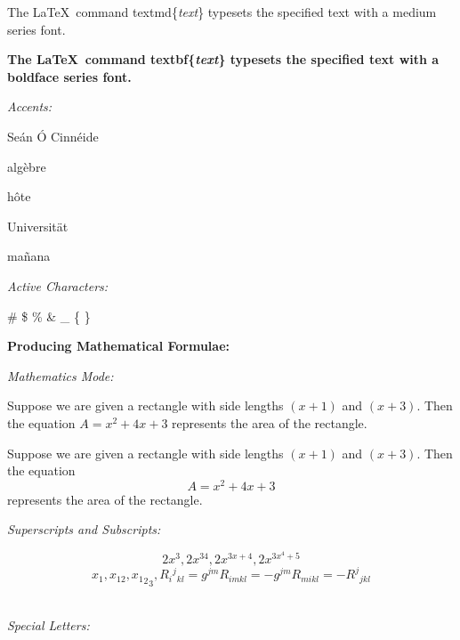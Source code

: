 \documentclass[12pt]{article}
\begin{document}
\textmd{The \LaTeX\ command \texttt{\textup{}}textmd\{\textit{text}\} typesets the specified text with a medium series font.}

\textbf{The \LaTeX\ command \texttt{\textup{}}\textmd{textbf\{\textit{text}\}} typesets the specified text with a boldface series font.} \\

\noindent
\begin{large}\textit{Accents:}\end{large}

Se\'{a}n \'{O} Cinn\'{e}ide

alg\`{e}bre

h\^{o}te

Universit\"{a}t

ma\~{n}ana \\

\noindent
\begin{large}\textit{Active Characters:}\end{large}

\# \$ \% \& \_ \{ \} \texttt{}   \\

\bigbreak
\noindent
\begin{Large}\textbf{Producing Mathematical Formulae:}\end{Large}
\bigbreak

\noindent
\begin{large}\textit{Mathematics Mode:}\end{large}

Suppose we are given a rectangle with side lengths $(x+1)$ and $(x+3)$. Then the equation $A=x^2+4x+3$ represents the area of the rectangle.

Suppose we are given a rectangle with side lengths $(x+1)$ and $(x+3)$. Then the equation $$A=x^2+4x+3$$ represents the area of the rectangle. \\

\noindent
\begin{large}\textit{Superscripts and Subscripts:}\end{large}

\[ 2x^3, 2x^{34}, 2x^{3x+4}, 2x^{3x^4+5} \]
\[ x_1, x_{12}, {{x_1}_2}_3, 
   R_i{}^j{}_{kl} = g^{jm} R_{imkl}
   = - g^{jm} R_{mikl} = - R^j{}_{jkl} \] \\

\noindent
\begin{large}\textit{Special Letters:}\end{large}
\end{document}
